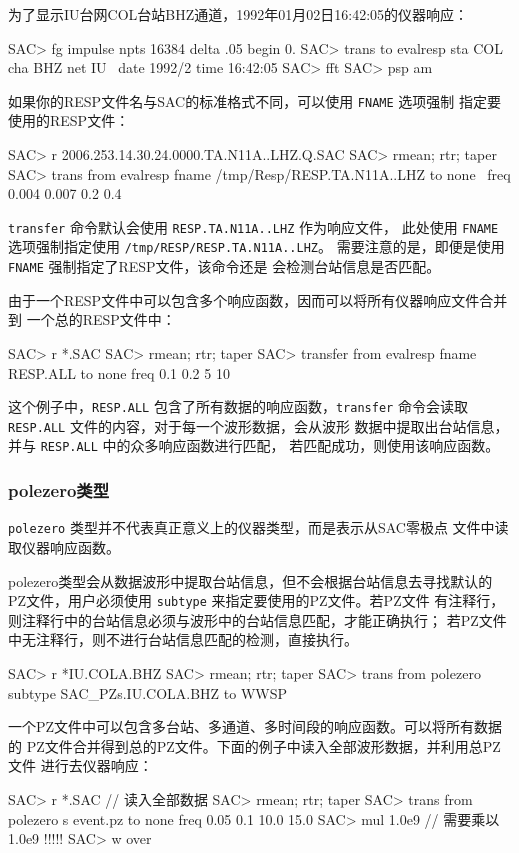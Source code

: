 为了显示IU台网COL台站BHZ通道，1992年01月02日16:42:05的仪器响应：
\begin{SACCode}
SAC> fg impulse npts 16384 delta .05 begin 0.
SAC> trans to evalresp sta COL cha BHZ net IU \
                    date 1992/2 time 16:42:05
SAC> fft
SAC> psp am
\end{SACCode}

如果你的RESP文件名与SAC的标准格式不同，可以使用 \texttt{FNAME} 选项强制
指定要使用的RESP文件：
\begin{SACCode}
SAC> r 2006.253.14.30.24.0000.TA.N11A..LHZ.Q.SAC
SAC> rmean; rtr; taper
SAC> trans from evalresp fname /tmp/Resp/RESP.TA.N11A..LHZ to none \
                        freq 0.004 0.007 0.2 0.4
\end{SACCode}
\texttt{transfer} 命令默认会使用 \texttt{RESP.TA.N11A..LHZ} 作为响应文件，
此处使用 \texttt{FNAME} 选项强制指定使用 \texttt{/tmp/RESP/RESP.TA.N11A..LHZ}。
需要注意的是，即便是使用 \texttt{FNAME} 强制指定了RESP文件，该命令还是
会检测台站信息是否匹配。

由于一个RESP文件中可以包含多个响应函数，因而可以将所有仪器响应文件合并到
一个总的RESP文件中：
\begin{SACCode}
SAC> r *.SAC
SAC> rmean; rtr; taper
SAC> transfer from evalresp fname RESP.ALL to none freq 0.1 0.2 5 10
\end{SACCode}
这个例子中，\texttt{RESP.ALL} 包含了所有数据的响应函数，\texttt{transfer}
命令会读取 \texttt{RESP.ALL} 文件的内容，对于每一个波形数据，会从波形
数据中提取出台站信息，并与 \texttt{RESP.ALL} 中的众多响应函数进行匹配，
若匹配成功，则使用该响应函数。

\subsubsection{polezero类型}
\texttt{polezero} 类型并不代表真正意义上的仪器类型，而是表示从SAC零极点
文件中读取仪器响应函数。

polezero类型会从数据波形中提取台站信息，但不会根据台站信息去寻找默认的
PZ文件，用户必须使用 \texttt{subtype} 来指定要使用的PZ文件。若PZ文件
有注释行，则注释行中的台站信息必须与波形中的台站信息匹配，才能正确执行；
若PZ文件中无注释行，则不进行台站信息匹配的检测，直接执行。
\begin{SACCode}
SAC> r *IU.COLA.BHZ
SAC> rmean; rtr; taper
SAC> trans from polezero subtype SAC_PZs.IU.COLA.BHZ to WWSP
\end{SACCode}

一个PZ文件中可以包含多台站、多通道、多时间段的响应函数。可以将所有数据的
PZ文件合并得到总的PZ文件。下面的例子中读入全部波形数据，并利用总PZ文件
进行去仪器响应：
\begin{SACCode}
SAC> r *.SAC          // 读入全部数据
SAC> rmean; rtr; taper
SAC> trans from polezero s event.pz to none freq 0.05 0.1 10.0 15.0
SAC> mul 1.0e9        // 需要乘以1.0e9 !!!!!
SAC> w over
\end{SACCode}

